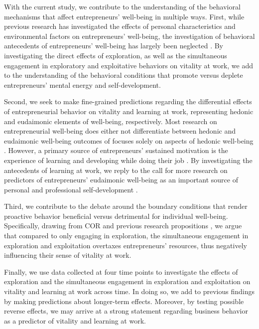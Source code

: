 \documentclass[man, 12pt, a4paper, noextraspace]{apa6}
\begin{document}
With the current study, we contribute to the understanding of the behavioral mechanisms that affect entrepreneurs' well-being in multiple ways. 
First, while previous research has investigated the effects of personal characteristics and environmental factors on entrepreneurs' well-being, the investigation of behavioral antecedents of entrepreneurs' well-being has largely been neglected \parencite[see]{Stephan2018}. 
By investigating the direct effects of exploration, as well as the simultaneous engagement in exploratory and exploitative behaviors on vitality at work, we add to the understanding of the behavioral conditions that promote versus deplete entrepreneurs' mental energy and self-development. \par 

Second, we seek to make fine-grained predictions regarding the differential effects of entrepreneurial behavior on vitality and learning at work, representing hedonic and eudaimonic elements of well-being, respectively. 
Most research on entrepreneurial well-being does either not differentiate between hedonic and eudaimonic well-being outcomes of focuses solely on aspects of hedonic well-being \parencite[see][]{Stephan2018, Ryff2019}. 
However, a primary source of entrepreneurs' sustained motivation is the experience of learning and developing while doing their job \parencite{Jayawarna2013}.   
By investigating the antecedents of learning at work, we reply to the call for more research on predictors of entrepreneurs' eudaimonic well-being as an important source of personal and professional self-development \parencite{Stephan2018, Ryff2019}. \par

Third, we contribute to the debate around the boundary conditions that render proactive behavior beneficial versus detrimental for individual well-being. 
Specifically, drawing from COR \parencite{Hobfoll.1989} and previous research propositions \parencite{Hunter2017}, we argue that compared to only engaging in exploration, the simultaneous engagement in exploration and exploitation overtaxes entrepreneurs' resources, thus negatively influencing their sense of vitality at work.  \par 

Finally, we use data collected at four time points to investigate the effects of exploration and the simultaneous engagement in exploration and exploitation on vitality and learning at work across time.
In doing so, we add to previous findings \parencite[e.g.,][]{Niessen.2012} by making predictions about longer-term effects. 
Moreover, by testing possible reverse effects, we may arrive at a strong statement regarding business behavior as a predictor of vitality and learning at work. 
\end{document}
